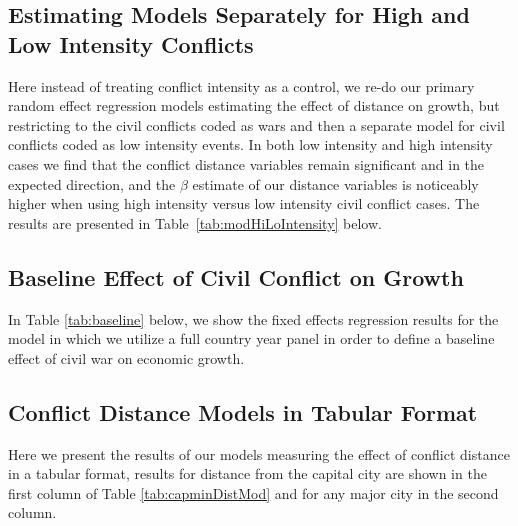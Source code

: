 
\FloatBarrier
\newpage

\subsection{Estimating Models Separately for High and Low Intensity Conflicts}

Here instead of treating conflict intensity as a control, we re-do our primary random effect regression models estimating the effect of distance on growth, but restricting to the civil conflicts coded as wars and then a separate model for civil conflicts coded as low intensity events. In both low intensity and high intensity cases we find that the conflict distance variables remain significant and in the expected direction, and the $\beta$ estimate of our distance variables is noticeably higher when using high intensity versus low intensity civil conflict cases. The results are presented in Table~\ref{tab:modHiLoIntensity} below.


\FloatBarrier
\newpage

\subsection{Baseline Effect of Civil Conflict on Growth}

In Table \ref{tab:baseline} below, we show the fixed effects regression results for the model in which we utilize a full country year panel in order to define a baseline effect of civil war on economic growth. 


\FloatBarrier
\newpage

\subsection{Conflict Distance Models in Tabular Format}

Here we present the results of our models measuring the effect of conflict distance in a tabular format, results for distance from the capital city are shown in the first column of Table \ref{tab:capminDistMod} and for any major city in the second column.  



\FloatBarrier
\newpage

